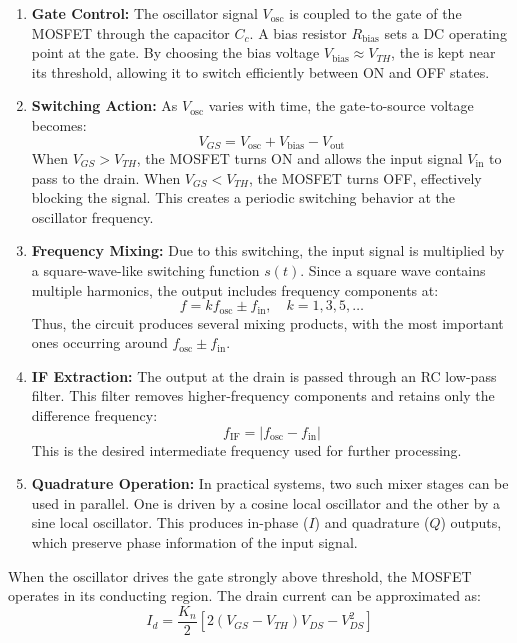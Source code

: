 \documentclass[conference]{IEEEtran}
\begin{document}
\begin{enumerate}
    \item \textbf{Gate Control:}  
    The oscillator signal $V_{\text{osc}}$ is coupled to the gate of the MOSFET through the capacitor $C_c$. A bias resistor $R_{\text{bias}}$ sets a DC operating point at the gate. By choosing the bias voltage $V_{\text{bias}} \approx V_{TH}$, the is kept near its threshold, allowing it to switch efficiently between ON and OFF states.

    \item \textbf{Switching Action:}  
    As $V_{\text{osc}}$ varies with time, the gate-to-source voltage becomes:
    \[
    V_{GS} = V_{\text{osc}} + V_{\text{bias}} - V_{\text{out}}
    \]
    When $V_{GS} > V_{TH}$, the MOSFET turns ON and allows the input signal $V_{\text{in}}$ to pass to the drain. When $V_{GS} < V_{TH}$, the MOSFET turns OFF, effectively blocking the signal. This creates a periodic switching behavior at the oscillator frequency.

    \item \textbf{Frequency Mixing:}  
    Due to this switching, the input signal is multiplied by a square-wave-like switching function $s(t)$. Since a square wave contains multiple harmonics, the output includes frequency components at:
    \[
    f = k f_{\text{osc}} \pm f_{\text{in}}, \quad k = 1,3,5,\dots
    \]
    Thus, the circuit produces several mixing products, with the most important ones occurring around $f_{\text{osc}} \pm f_{\text{in}}$.

    \item \textbf{IF Extraction:}  
    The output at the drain is passed through an RC low-pass filter. This filter removes higher-frequency components and retains only the difference frequency:
    \[
    f_{\text{IF}} = |f_{\text{osc}} - f_{\text{in}}|
    \]
    This is the desired intermediate frequency used for further processing.

    \item \textbf{Quadrature Operation:}  
    In practical systems, two such mixer stages can be used in parallel. One is driven by a cosine local oscillator and the other by a sine local oscillator. This produces in-phase ($I$) and quadrature ($Q$) outputs, which preserve phase information of the input signal.
\end{enumerate}

\bigskip

When the oscillator drives the gate strongly above threshold, the MOSFET operates in its conducting region. The drain current can be approximated as:
\begin{equation}
I_d = \frac{K_n}{2} \left[ 2(V_{GS} - V_{TH})V_{DS} - V_{DS}^2 \right]
\end{equation}
\end{document}
